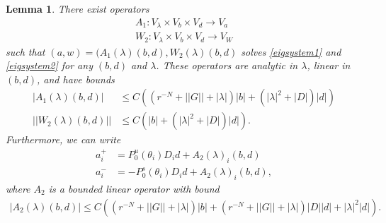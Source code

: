 \documentclass[12pt]{elsarticle}
\newtheorem{lemma}{Lemma}
\begin{document}
\begin{lemma}\label{eiginv2}
There exist operators 
\begin{align*}
A_1 : V_\lambda \times V_b \times V_d \rightarrow V_a \\
W_2 : V_\lambda \times V_b \times V_d \rightarrow V_W
\end{align*}
such that $(a, w) = (A_1(\lambda)(b,d), W_2(\lambda)(b,d)$ solves \cref{eigsystem1} and \cref{eigsystem2} for any $(b, d)$ and $\lambda$. These operators are analytic in $\lambda$, linear in $(b,d)$, and have bounds 
\begin{align}
|A_1(\lambda)(b, d)| &\leq C \left( (r^{-N} + ||G|| + |\lambda| ) |b| + (|\lambda|^2 + |D| ) |d| \right) \label{A1bound} \\
||W_2(\lambda)(b,d)|| &\leq C \left( |b| + (|\lambda|^2 + |D|) |d| \right). \label{W2bound}
\end{align}
Furthermore, we can write
\begin{align*}
a_i^+ &= P_0^u(\theta_i) D_i d + A_2(\lambda)_i(b,d) \\
a_i^- &= -P_0^s(\theta_i) D_i d + A_2(\lambda)_i(b,d),
\end{align*}
where $A_2$ is a bounded linear operator with bound
\begin{align}\label{A2bound}
|A_2(\lambda)(b,d)| \leq 
C\left( (r^{-N} + ||G|| + |\lambda| )|b| + (r^{-N} + ||G|| + |\lambda|)|D||d| + |\lambda|^2 |d|  \right).
\end{align}


\end{lemma}
\end{document}
